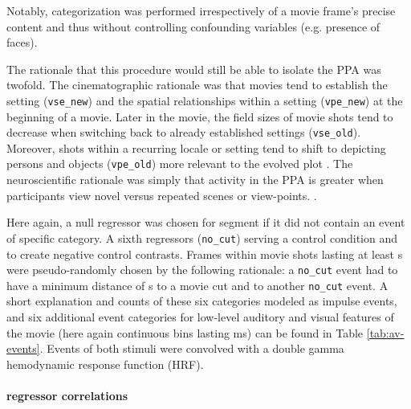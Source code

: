 \documentclass[english]{article}
\begin{document}
Notably, categorization was performed irrespectively of a movie frame's precise
content and thus without controlling confounding variables (e.g. presence of
faces).

The rationale that this procedure would still be able to isolate the PPA was
twofold.
The cinematographic rationale was that movies tend to establish the setting
(\texttt{vse\_new}) and the spatial relationships within a setting
(\texttt{vpe\_new}) at the beginning of a movie.
Later in the movie, the field sizes of movie shots tend to decrease when
switching back to already established settings (\texttt{vse\_old}).
Moreover, shots within a recurring locale or setting tend to shift to depicting
persons and objects (\texttt{vpe\_old}) more relevant to the evolved plot
\citep{brown2012cinematography, mercado2011filmmakers}.
The neuroscientific rationale was simply that activity in the PPA is greater
when participants view novel versus repeated scenes or view-points.
\citep{epstein1999parahippocampal, grill2006repetition}.

Here again, a null regressor was chosen for segment if it did not contain an
event of specific category.
A sixth regressors (\texttt{no\_cut}) serving a control condition and to create
negative control contrasts. Frames within movie shots lasting at least
\unit[20]{s} were pseudo-randomly chosen by the following rationale:
a \texttt{no\_cut} event had to have a minimum distance of \unit[10]{s} to a
movie cut and to another \texttt{no\_cut} event.
A short explanation and counts of these six categories modeled as impulse
events, and six additional event categories for low-level auditory and visual
features of the movie (here again continuous bins lasting \unit[40]{ms}) can be
found in Table \ref{tab:av-events}.
Events of both stimuli were convolved with a double gamma hemodynamic response
function (HRF).


\paragraph{regressor correlations}
\end{document}
